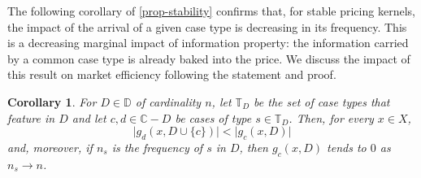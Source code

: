 \documentclass[ecta,nameyear,draft]{econsocart}
\newcommand{\bs}{-}%
\newcommand{\mbbd}{{\mathds D}}
\newcommand{\mbbc}{{\mathds C}}
\newcommand{\mbbt}{{\mathds {T}}}
\theoremstyle{plain}
\newtheorem{corollary}{Corollary}%
\theoremstyle{remark}
\begin{document}
The following corollary of \cref{prop-stability} confirms that, for stable
pricing kernels, the impact of the arrival of a given case type is decreasing
in its frequency.  This is a decreasing marginal impact of information
property: the information carried by a common case type is already baked into
the price.  We discuss the impact of this result on market efficiency following
the statement and proof.
\begin{corollary}\label{cor-efficiency}
  For $D \in \mbbd$ of cardinality $n$, let $\mbbt_D$ be the set of case types
  that feature in $D$ and let $c, d \in \mbbc \bs D$ be cases of type $s \in
  \mbbt_D$. %
  Then, for every $x \in X$,
  \begin{equation*}
    \lvert g_{d}(x, D\cup \{c\}) \rvert < \lvert g_c(x, D)\rvert
  \end{equation*}
  and, moreover, if $n_s$ is the frequency of $s$ in $D$, then $g_c(x, D)$
  tends to $0$ as $n_s \rightarrow n$. 
\end{corollary}
\end{document}
